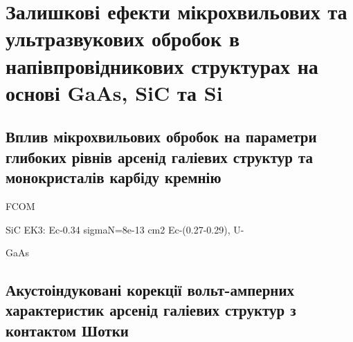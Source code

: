 \documentclass[a4paper,14pt,oneside,openany]{memoir}
\begin{document}







%














%

\chapter{Залишкові ефекти мікрохвильових та ультразвукових обробок в напівпровідникових структурах на основі GaAs, SiC та Si\label{Ch_UST_MW}}

\section{Вплив мікрохвильових обробок на параметри глибоких рівнів арсенід галіевих структур та монокристалів карбіду кремнію}

\cite{KorshunovBook,Kozlovs,Zaveryukhin2002:2,OlikhFTT,Boltovets,Bacherikov2003r,Belyaev1998JTFr,Saiko1993,OlikhSSC,
Rzanov,Shishiyanu,Vaitkus,Samoilov1994,ZOHM2000}

FCOM
\cite{Rjanov1981,paton1993,Vinnik1989,ZOHM2000,BHUNIA1998,Bacherikov2003r,Pashkov1994r,Boltovets,Kr1996,Milenin1994,
BelyaevIntac,ASHKINADZE1996,ProcSPIE,Venger1999,Godwod,ThoricBook,BergBook,Lebed1999,Anikin1991:2,Anikin1991:3,Lebedev2001}


SiC
EK3: Ec-0.34 sigmaN=8e-13 cm2 \cite{Kuznets1997}
Ec-(0.27-0.29), U- \cite{Hemmingsson}


GaAs
\cite{Neild1991}

\section{Акустоіндуковані корекції вольт-амперних характеристик арсенід галіевих структур з контактом Шотки\label{MSGA}}
\end{document}
